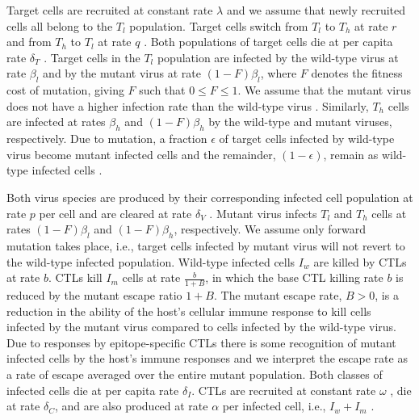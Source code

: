 \documentclass[11pt, oneside]{article}    %
\begin{document}
\vspace{5mm}

	Target cells are recruited at constant rate $\lambda$ and we assume that newly recruited cells all belong to the $T_l$ population. Target cells switch from $T_l$ to $T_h$ at rate $r$ and from $T_h$ to $T_l$ at rate $q$ \cite{Vaidya}. Both populations of target cells die at per capita rate $\delta_T$ \cite{Perelson, Schwartz}. Target cells in the $T_l$ population are infected by the wild-type virus at rate $\beta_l$ and by the mutant virus at rate $(1-F) \beta_l$, where $F$ denotes the fitness cost of mutation, giving $F$ such that $0 \leqslant F \leqslant 1$. We assume that the mutant virus does not have a higher infection rate than the wild-type virus \cite{Ganusov2011}. Similarly, $T_h$ cells are infected at rates $\beta_h$ and $(1-F) \beta_h$ by the wild-type and mutant viruses, respectively. Due to mutation,  a fraction $\epsilon$ of target cells infected by wild-type virus become mutant infected cells and the remainder, $(1-\epsilon)$, remain as wild-type infected cells \cite{Konrad}.

\vspace{5mm}
	
	Both virus species are produced by their corresponding infected cell population at rate $p$ per cell and are cleared at rate $\delta_V$ \cite{Konrad}. Mutant virus infects $T_l$ and $T_h$ cells at rates $(1-F) \beta_l$ and $(1-F) \beta_h$, respectively. We assume only forward mutation takes place, i.e., target cells infected by mutant virus will not revert to the wild-type infected population. Wild-type infected cells $I_w$ are killed by CTLs at rate $b$. CTLs kill $I_m$ cells at rate $\frac{b}{1+B}$, in which the base CTL killing rate $b$ is reduced by the mutant escape ratio $1+B$. The mutant escape rate, $B > 0$, is a reduction in the ability of the host's cellular immune response to kill cells infected by the mutant virus compared to cells infected by the wild-type virus. Due to responses by epitope-specific CTLs there is some recognition of mutant infected cells by the host's immune responses \cite{Konrad, Barouch} and we interpret the escape rate as a rate of escape averaged over the entire mutant population. Both classes of infected cells die at per capita rate $\delta_I$. CTLs are recruited at constant rate $\omega$ \cite{Conway}, die at rate $\delta_C$, and are also produced at rate $\alpha$ per infected cell, i.e., $I_w + I_m$ \cite{Konrad, De Boer}.

\vspace{5mm}
\end{document}
